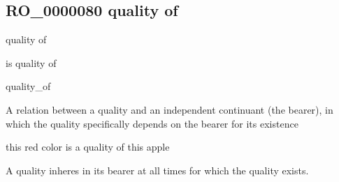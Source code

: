 \documentclass[letterpaper,10pt,english]{sphinxmanual}
\begin{document}
\subsection{RO\_0000080 \sphinxhyphen{} quality of}
\label{\detokenize{doc-RO_0000080:ro-0000080-quality-of}}\label{\detokenize{doc-RO_0000080:index-0}}\label{\detokenize{doc-RO_0000080::doc}}
\begin{sphinxShadowBox}

\sphinxAtStartPar
quality of
\end{sphinxShadowBox}

\begin{sphinxShadowBox}

\sphinxAtStartPar
is quality of

\sphinxAtStartPar
quality\_of
\end{sphinxShadowBox}

\begin{sphinxShadowBox}

\sphinxAtStartPar
{\hyperref[\detokenize{doc-RO_0000052::doc}]{}}
\end{sphinxShadowBox}

\begin{sphinxShadowBox}

\sphinxAtStartPar
A relation between a quality and an independent continuant (the bearer), in which the quality specifically depends on the bearer for its existence
\end{sphinxShadowBox}

\begin{sphinxShadowBox}

\sphinxAtStartPar
this red color is a quality of this apple
\end{sphinxShadowBox}

\begin{sphinxShadowBox}

\sphinxAtStartPar
A quality inheres in its bearer at all times for which the quality exists.
\end{sphinxShadowBox}

\begin{sphinxShadowBox}

\sphinxAtStartPar
{}
\end{sphinxShadowBox}
\begin{quote}

\ignorespaces \end{quote}
\end{document}

